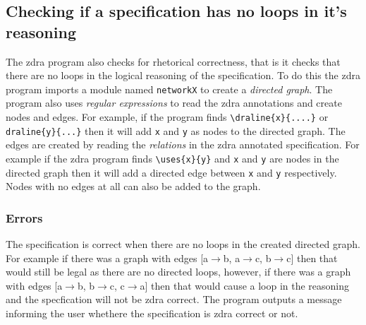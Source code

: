 \subsection{Checking if a specification has no loops in it's reasoning}
\label{subsec:loops}

The \gls{zdra} program also checks for rhetorical correctness, that is it checks
that there are no loops in the logical reasoning of the specification. To do
this the \gls{zdra} program imports a module named \texttt{networkX} to create a
\emph{directed graph}. The program also uses \emph{regular expressions} to read
the \gls{zdra} annotations and create nodes and edges. For example, if the
program finds \verb|\draline{x}{....}| or \verb|draline{y}{...}| then it will
add \texttt{x} and \texttt{y} as nodes to the directed graph. The edges are
created by reading the \emph{relations} in the \gls{zdra} annotated
specification. For example if the \gls{zdra} program finds \verb|\uses{x}{y}|
and \texttt{x} and \texttt{y} are nodes in the directed graph then it will add a
directed edge between \texttt{x} and \texttt{y} respectively. Nodes with no
edges at all can also be added to the graph.

\subsubsection{Errors}
\label{subsubsec:zdra_looperrors}

The specification is correct when there are no loops in the created directed
graph. For example if there was a graph with edges [a$\rightarrow$b,
a$\rightarrow$c, b$\rightarrow$c] then that would still be legal as there are no
directed loops, however, if there was a graph with edges [a$\rightarrow$b,
b$\rightarrow$c, c$\rightarrow$a] then that would cause a loop in the reasoning
and the specfication will not be \gls{zdra} correct. The program outputs a
message informing the user whethere the specification is \gls{zdra} correct or
not.

